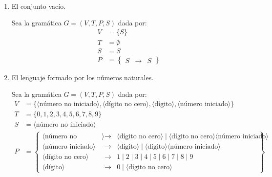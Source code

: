 \begin{ejercicio}
\begin{enumerate}
        \item El conjunto vacío.
        
        Sea la gramática $G=\left(V,T,P,S\right)$ dada por:
        \begin{align*}
            V &= \{S\} \\
            T &= \emptyset \\
            S &= S \\
            P &= \left\{
                \begin{array}{rcl}
                    S &\rightarrow & S
                \end{array}
            \right\}
        \end{align*}

        \item El lenguaje formado por los números naturales.
        
        Sea la gramática $G=\left(V,T,P,S\right)$ dada por:
        \begin{align*}
            V &= \{\langle \text{número no iniciado} \rangle, \langle \text{dígito no cero} \rangle, \langle \text{dígito} \rangle, \langle \text{número iniciado} \rangle\} \\
            T &= \{0,1,2,3,4,5,6,7,8,9\} \\
            S &= \langle \text{número no iniciado} \rangle \\
            P &= \left\{
                \begin{array}{rcl}
                    \langle \text{número no iniciado} \rangle &\rightarrow & \langle \text{dígito no cero} \rangle \mid \langle \text{dígito no cero} \rangle \langle \text{número iniciado} \rangle \\
                    \langle \text{número iniciado} \rangle &\rightarrow & \langle \text{dígito} \rangle \mid \langle \text{dígito} \rangle \langle \text{número iniciado} \rangle \\
                    \langle \text{dígito no cero} \rangle &\rightarrow & 1 \mid 2 \mid 3 \mid 4 \mid 5 \mid 6 \mid 7 \mid 8 \mid 9 \\
                    \langle \text{dígito} \rangle &\rightarrow & 0 \mid \langle \text{dígito no cero} \rangle
                \end{array}
            \right\}
        \end{align*}


\end{enumerate}
\end{ejercicio}
